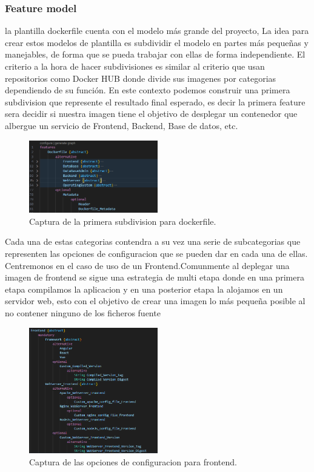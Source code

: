 \documentclass[12pt, a4paper, twoside]{article}
\begin{document}
\subsubsection{Feature model}

la plantilla dockerfile cuenta con el modelo más grande del proyecto, La idea para crear estos modelos de plantilla es subdividir el modelo en partes más pequeñas y manejables, de forma que se pueda trabajar con ellas de forma independiente.
El criterio a la hora de hacer subdivisiones es similar al criterio que usan repositorios como Docker HUB \cite{docker_hub} donde divide sus imagenes por categorias dependiendo de su función.
En este contexto podemos construir una primera subdivision que represente el resultado final esperado, es decir la primera feature sera decidir si nuestra imagen 
tiene el objetivo de desplegar un contenedor que albergue un servicio de Frontend, Backend, Base de datos, etc.

\begin{figure}[h]
	\centering
	  \includegraphics[width=0.5\textwidth]{dockerfile.uvl.png}
	\caption{Captura de la primera subdivision para dockerfile.}
\end{figure}

Cada una de estas categorias contendra a su vez una serie de subcategorias que representen las opciones de configuracion que se pueden dar en cada una de ellas.
\\Centremonos en el caso de uso de un Frontend.Comunmente al deplegar una imagen de frontend se sigue una estrategia de multi etapa \cite{docker_multistage} donde en una primera etapa compilamos la aplicacion 
y en una posterior etapa la alojamos en un servidor web, esto con el objetivo de crear una imagen lo más pequeña posible al no contener ninguno de los ficheros fuente

\begin{figure}[h]
	\centering
	  \includegraphics[width=0.5\textwidth]{dockerfile.frontend.png}
	\caption{Captura de las opciones de configuracion para frontend.}
\end{figure}
\end{document}
